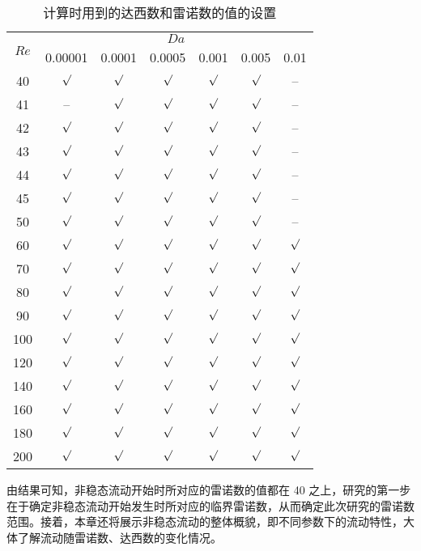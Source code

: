 \begin{table}
	\caption{计算时用到的达西数和雷诺数的值的设置}\label{tab: DaRe}
	\vspace{.5em}\centering\wuhao
	\begin{tabular}{*{7}{c}}
		\toprule[1.5pt]
		\multirow{2}[3]{*}{$Re$} & \multicolumn{6}{c}{$Da$} \\
		\cmidrule[.67pt](lr){2-7}
		& 0.00001 & 0.0001 & 0.0005 & 0.001 & 0.005 & 0.01 \\
		\midrule[1pt]
		40  & $\surd$ & $\surd$ & $\surd$ & $\surd$ & $\surd$ & -- \\
		41  & --      & $\surd$ & $\surd$ & $\surd$ & $\surd$ & -- \\
		42  & $\surd$ & $\surd$ & $\surd$ & $\surd$ & $\surd$ & -- \\
		43  & $\surd$ & $\surd$ & $\surd$ & $\surd$ & $\surd$ & -- \\
		44  & $\surd$ & $\surd$ & $\surd$ & $\surd$ & $\surd$ & -- \\
		45  & $\surd$ & $\surd$ & $\surd$ & $\surd$ & $\surd$ & -- \\
		50  & $\surd$ & $\surd$ & $\surd$ & $\surd$ & $\surd$ & -- \\
		60  & $\surd$ & $\surd$ & $\surd$ & $\surd$ & $\surd$ & $\surd$ \\
		70  & $\surd$ & $\surd$ & $\surd$ & $\surd$ & $\surd$ & $\surd$ \\
		80  & $\surd$ & $\surd$ & $\surd$ & $\surd$ & $\surd$ & $\surd$ \\
		90  & $\surd$ & $\surd$ & $\surd$ & $\surd$ & $\surd$ & $\surd$ \\
		100 & $\surd$ & $\surd$ & $\surd$ & $\surd$ & $\surd$ & $\surd$ \\
		120 & $\surd$ & $\surd$ & $\surd$ & $\surd$ & $\surd$ & $\surd$ \\
		140 & $\surd$ & $\surd$ & $\surd$ & $\surd$ & $\surd$ & $\surd$ \\
		160 & $\surd$ & $\surd$ & $\surd$ & $\surd$ & $\surd$ & $\surd$ \\
		180 & $\surd$ & $\surd$ & $\surd$ & $\surd$ & $\surd$ & $\surd$ \\
		200 & $\surd$ & $\surd$ & $\surd$ & $\surd$ & $\surd$ & $\surd$ \\
		\bottomrule[1.5pt]
	\end{tabular}
\end{table}

由结果可知，非稳态流动开始时所对应的雷诺数的值都在 40 之上，研究的第一步在于确定非稳态流动开始发生时所对应的临界雷诺数，从而确定此次研究的雷诺数范围。接着，本章还将展示非稳态流动的整体概貌，即不同参数下的流动特性，大体了解流动随雷诺数、达西数的变化情况。

